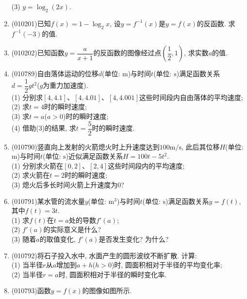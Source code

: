 \documentclass[10pt,a4paper]{article}
\begin{document}
\begin{enumerate}[1.]
(3) $y=\log_2(2x)$.
\item {\tiny (010201)}已知$f(x)=1-\log_2x$, 设$y=f^{-1}(x)$是$y=f(x)$的反函数. 求$f^{-1}(-3)$的值.
\item {\tiny (010202)}已知函数$y=\dfrac a{x+1}$的反函数的图像经过点$(\dfrac 12, 1)$, 求实数$a$的值.
\item {\tiny (010789)}自由落体运动的位移$d$(单位: $\text{m}$)与时间$t$(单位: $\text{s}$)满足函数关系$d=\dfrac 12gt^2$($g$为重力加速度).\\
(1) 分别求$[4,4.1]$、$[4,4.01]$、$[4,4.001]$这些时间段内自由落体的平均速度;\\
(2) 求$t=4$时的瞬时速度;\\
(3) 求$t=a$($a>0$)时的瞬时速度;\\
(4) 借助(3)的结果, 求$t=\dfrac 52$时的瞬时速度.
\item {\tiny (010790)}竖直向上发射的火箭熄火时上升速度达到$100\text{m}/\text{s}$, 此后其位移$H$(单位: $\text{m}$)与时间$t$(单位: $\text{s}$)近似满足函数关系$H=100t-5t^2$.\\
(1) 分别求火箭在$[0, 2]$、$[2, 4]$这些时间段内的平均速度;\\
(2) 求火箭在$t=2$时的瞬时速度;\\
(3) 熄火后多长时间火箭上升速度为$0$?
\item {\tiny (010791)}某水管的流水量$y$(单位: $\text{m}^3$)与时间$t$(单位: $\text{s}$)满足函数关系$y=f(t)$, 其中$f(t)=3t$.\\
(1) 求$f(t)$在$t=a$处的导数$f'(a)$;\\
(2) $f'(a)$的实际意义是什么?\\
(3) 随着$a$的取值变化, $f'(a)$是否发生变化? 为什么?
\item {\tiny (010792)}将石子投入水中, 水面产生的圆形波纹不断扩散. 计算:\\
(1) 当半径$r$从$a$增加到$a+h$($h>0$)时, 圆面积相对于半径的平均变化率;\\
(2) 当半径$r=a$时, 圆面积相对于半径的瞬时变化率.
\item {\tiny (010793)}函数$y=f(x)$的图像如图所示.
\begin{center}
\end{center}
\end{enumerate}
\end{document}
